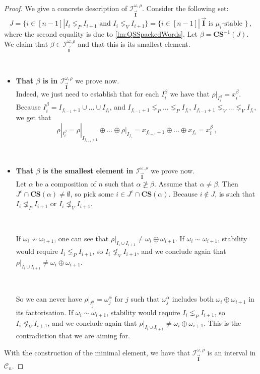 \documentclass[12pt, reqno]{amsart}
\theoremstyle{definition}
\newcommand{\III}{\vec{\mathbf{I}}}
\begin{document}
\begin{proof}
We give a concrete description of $\mathcal I^{\omega, \rho}_{\III}$.
Consider the following set:
$$J = \{i \in [n-1] | I_i \lneq_P I_{i+1} \text{ and } I_i \lneq_V I_{i+1} \} = \{i \in [n-1] | \, \III \text{ is $\mu_i$-stable } \} \, ,$$
where the second equality is due to \cref{lm:QSSpackedWords}.
Let $\beta = \mathbf{CS}^{-1}( J)$. 
We claim that $\beta \in \mathcal I^{\omega, \rho}_{\III}$ and that this is its smallest element.

\
\begin{itemize}
\item {\bf That $\beta$ is in $\mathcal I^{\omega, \rho}_{\III}$} we prove now.\\
Indeed, we just need to establish that for each $I^{\beta}_i$ we have that $\rho|_{I^{\beta}_i} = x^{\beta}_i$.
Because $I^{\beta}_i = I_{f_{i-1} + 1} \cup \dots \cup I_{f_i}$, and $I_{f_{i-1} + 1} \lneq_P \dots \lneq_P I_{f_i}$, $I_{f_{i-1} + 1} \lneq_V \dots \lneq_V I_{f_i}$, we get that 
$$\rho|_{I^{\beta}_i} = \rho|_{I_{f_{i-1} + 1}} \oplus \dots \oplus \rho|_{I_{f_i}} = x_{f_{i-1} + 1} \oplus \dots\oplus x_{f_i} = x^{\beta}_i\,  ,$$

\

    \item {\bf That $\beta$ is the smallest element in $\mathcal I^{\omega, \rho}_{\III}$} we prove now. \\
Let $\alpha $ be a composition of $n$ such that $\alpha \not \geq \beta$.
Assume that $\alpha \neq \beta$. 
Then $J^c \cap \mathbf{CS}(\alpha)\neq \emptyset $, so pick some $i \in  J^c \cap \mathbf{CS}(\alpha) $.
Because $i \not\in J$, is such that $ I_i \not\lneq_P I_{i+1} \text{ or } I_i \not\lneq_V I_{i+1} $.

\

If $\omega_i \not\sim \omega_{i+1}$, one can see that $\rho|_{I_i \cup I_{i+1}} \neq \omega_i \oplus \omega_{i+1}$.
If $\omega_i \sim \omega_{i+1}$, stability would require $I_i \lneq_P I_{i+1}$, so $I_i \not\lneq_V I_{i+1}$, and we conclude again that $\rho|_{I_i \cup I_{i+1}} \neq \omega_i \oplus \omega_{i+1}$.

\

So we can never have $\rho|_{I^{\alpha}_j} = \omega^{\alpha}_j$ for $j$ such that $\omega^{\alpha}_j$ includes both $\omega_i \oplus \omega_{i+1}$ in its factorisation.
If $\omega_i \sim \omega_{i+1}$, stability would require $I_i \lneq_P I_{i+1}$, so $I_i \not\lneq_V I_{i+1}$, and we conclude again that $\rho|_{I_i \cup I_{i+1}} \neq \omega_i \oplus \omega_{i+1}$.
This is the contradiction that we are aiming for.
\end{itemize}
With the construction of the minimal element, we have that $\mathcal I^{\omega, \rho}_{\III}$ is an interval in $\mathcal{C}_n$.
\end{proof}
\end{document}
